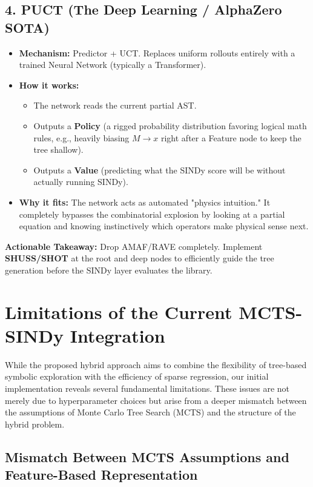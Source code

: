 \documentclass[11pt,a4paper]{article}
\begin{document}
\subsection*{4. PUCT (The Deep Learning / AlphaZero SOTA)}
\begin{itemize}
    \item \textbf{Mechanism:} Predictor + UCT. Replaces uniform rollouts entirely with a trained Neural Network (typically a Transformer).
    \item \textbf{How it works:}
    \begin{itemize}
        \item The network reads the current partial AST.
        \item Outputs a \textbf{Policy} (a rigged probability distribution favoring logical math rules, e.g., heavily biasing $M \rightarrow x$ right after a Feature node to keep the tree shallow).
        \item Outputs a \textbf{Value} (predicting what the SINDy score will be without actually running SINDy).
    \end{itemize}
    \item \textbf{Why it fits:} The network acts as automated "physics intuition." It completely bypasses the combinatorial explosion by looking at a partial equation and knowing instinctively which operators make physical sense next.
\end{itemize}

\vspace{0.5cm}
\noindent \textbf{Actionable Takeaway:} Drop AMAF/RAVE completely. Implement \textbf{SHUSS/SHOT} at the root and deep nodes to efficiently guide the tree generation before the SINDy layer evaluates the library.

\newpage

\section{Limitations of the Current MCTS-SINDy Integration}

While the proposed hybrid approach aims to combine the flexibility of tree-based symbolic exploration with the efficiency of sparse regression, our initial implementation reveals several fundamental limitations. These issues are not merely due to hyperparameter choices but arise from a deeper mismatch between the assumptions of Monte Carlo Tree Search (MCTS) and the structure of the hybrid problem.

\subsection{Mismatch Between MCTS Assumptions and Feature-Based Representation}
\end{document}
